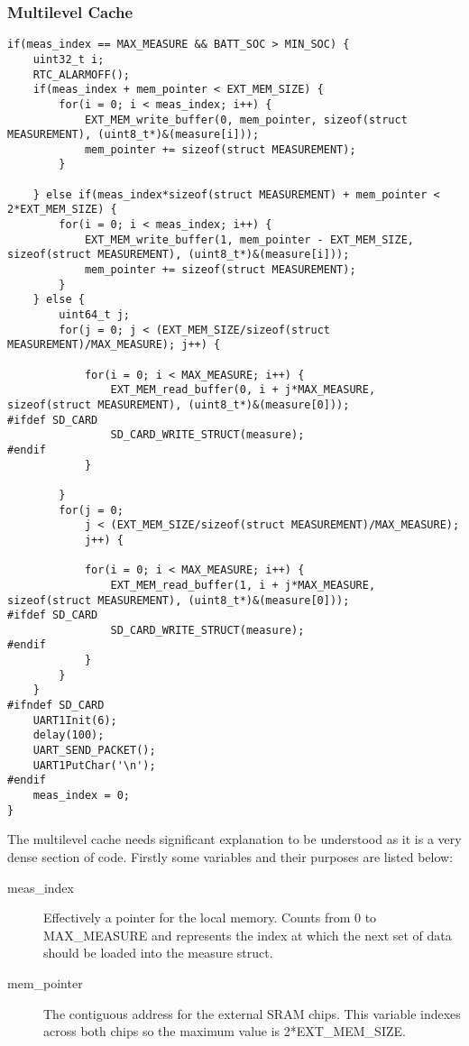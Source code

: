 \documentclass[12pt,openany,a4paper]{book}
\begin{document}
			\subsubsection{Multilevel Cache}
				\begin{lstlisting}
if(meas_index == MAX_MEASURE && BATT_SOC > MIN_SOC) {
	uint32_t i;
	RTC_ALARMOFF(); 
	if(meas_index + mem_pointer < EXT_MEM_SIZE) {
		for(i = 0; i < meas_index; i++) {
			EXT_MEM_write_buffer(0, mem_pointer, sizeof(struct MEASUREMENT), (uint8_t*)&(measure[i]));
			mem_pointer += sizeof(struct MEASUREMENT);
		}
		
	} else if(meas_index*sizeof(struct MEASUREMENT) + mem_pointer < 2*EXT_MEM_SIZE) {
		for(i = 0; i < meas_index; i++) {
			EXT_MEM_write_buffer(1, mem_pointer - EXT_MEM_SIZE, sizeof(struct MEASUREMENT), (uint8_t*)&(measure[i]));
			mem_pointer += sizeof(struct MEASUREMENT);
		}
	} else {
		uint64_t j;
		for(j = 0; j < (EXT_MEM_SIZE/sizeof(struct MEASUREMENT)/MAX_MEASURE); j++) {
			
			for(i = 0; i < MAX_MEASURE; i++) {
				EXT_MEM_read_buffer(0, i + j*MAX_MEASURE, sizeof(struct MEASUREMENT), (uint8_t*)&(measure[0]));
#ifdef SD_CARD                      
				SD_CARD_WRITE_STRUCT(measure);
#endif									
			}

		}
		for(j = 0;
			j < (EXT_MEM_SIZE/sizeof(struct MEASUREMENT)/MAX_MEASURE);
			j++) {
			
			for(i = 0; i < MAX_MEASURE; i++) {
				EXT_MEM_read_buffer(1, i + j*MAX_MEASURE, sizeof(struct MEASUREMENT), (uint8_t*)&(measure[0]));
#ifdef SD_CARD
				SD_CARD_WRITE_STRUCT(measure);
#endif
			}
		}
	}
#ifndef SD_CARD
	UART1Init(6);
	delay(100);
	UART_SEND_PACKET();
	UART1PutChar('\n');
#endif
	meas_index = 0;
}					
				\end{lstlisting}
				The multilevel cache needs significant explanation to be understood as it is a very dense section of code. Firstly some variables and their purposes are listed below: \\
				\begin{description}
					\item[meas\_index] Effectively a pointer for the local memory. Counts from 0 to MAX\_MEASURE and represents the index at which the next set of data should be loaded into the measure struct.
					\item[mem\_pointer] The contiguous address for the external SRAM chips. This variable indexes across both chips so the maximum value is 2*EXT\_MEM\_SIZE.
				\end{description}
				
\end{document}
